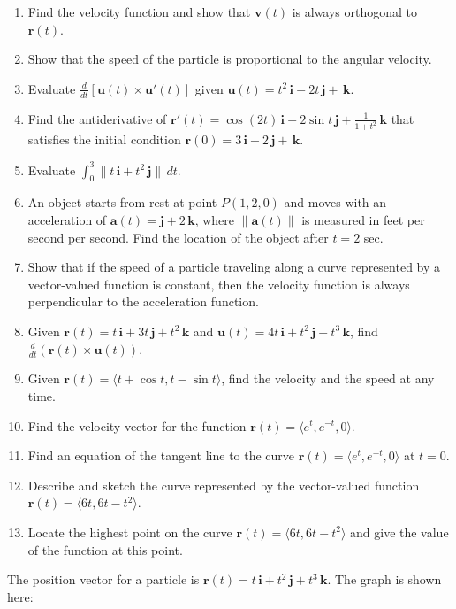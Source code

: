 \documentclass{exercises}
\begin{document}
\begin{enumerate}[resume]
\item Find the velocity function and show that $\mathbf{v}(t)$ is always orthogonal to $\mathbf{r}(t)$.
\item Show that the speed of the particle is proportional to the angular velocity.
\item Evaluate $\frac{d}{dt}[\mathbf{u}(t)\times \mathbf{u}'(t)]$ given $\mathbf{u}(t)=t^{2}\,\mathbf{i}-2t\,\mathbf{j}+\,\mathbf{k}$.
\item Find the antiderivative of $\mathbf{r}'(t)=\cos(2t)\,\mathbf{i}-2\sin t\,\mathbf{j}+\frac{1}{1+t^{2}}\,\mathbf{k}$ that satisfies the initial condition $\mathbf{r}(0)=3\,\mathbf{i}-2\,\mathbf{j}+\,\mathbf{k}$.
\item Evaluate $\int_{0}^{3}\|t\,\mathbf{i}+t^{2}\,\mathbf{j}\|\,dt$.
\item An object starts from rest at point $P(1,2,0)$ and moves with an acceleration of $\mathbf{a}(t)=\mathbf{j}+2\,\mathbf{k}$, where $\|\mathbf{a}(t)\|$ is measured in feet per second per second. Find the location of the object after $t=2$ sec.
\item Show that if the speed of a particle traveling along a curve represented by a vector-valued function is constant, then the velocity function is always perpendicular to the acceleration function.
\item Given $\mathbf{r}(t)=t\,\mathbf{i}+3t\,\mathbf{j}+t^{2}\,\mathbf{k}$ and $\mathbf{u}(t)=4t\,\mathbf{i}+t^{2}\,\mathbf{j}+t^{3}\,\mathbf{k}$, find $\frac{d}{dt}(\mathbf{r}(t)\times \mathbf{u}(t))$.
\item Given $\mathbf{r}(t)=\langle t+\cos t,t-\sin t\rangle$, find the velocity and the speed at any time.
\item Find the velocity vector for the function $\mathbf{r}(t)=\langle e^{t},e^{-t},0\rangle$.
\item Find an equation of the tangent line to the curve $\mathbf{r}(t)=\langle e^{t},e^{-t},0\rangle$ at $t=0$.
\item Describe and sketch the curve represented by the vector-valued function $\mathbf{r}(t)=\langle6t,6t-t^{2}\rangle$.
\item Locate the highest point on the curve $\mathbf{r}(t)=\langle6t,6t-t^{2}\rangle$ and give the value of the function at this point.
\end{enumerate}

The position vector for a particle is $\mathbf{r}(t)=t\,\mathbf{i}+t^{2}\,\mathbf{j}+t^{3}\,\mathbf{k}$. The graph is shown here:
\end{document}
